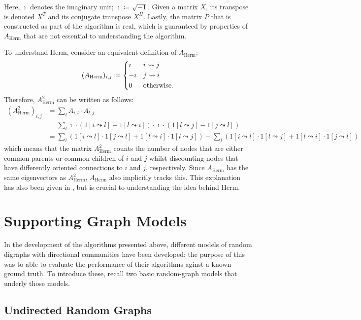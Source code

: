 Here, $\imath$ denotes the imaginary unit; $\imath \coloneqq \sqrt{-1}$. Given a 
matrix $X$, its transpose is denoted $X^T$ and its conjugate transpose $X^H$. Lastly, the matrix $P
$ that is constructed as part of the algorithm is real, which is guaranteed by properties 
of $A_\mathrm{Herm}$ that are not essential to understanding the algorithm.

To understand Herm, consider an equivalent definition of 
$A_\mathrm{Herm}$:
$$
	(A_\mathrm{Herm})_{i,j} \coloneqq
	\begin{dcases}
		\imath & i \leadsto j \\
		- \imath & j \leadsto i \\
		0 & \text{otherwise.}
	\end{dcases}
$$
Therefore, $A_\mathrm{Herm}^2$ can be written as follows:
\begin{align*}
	(A_{\mathrm{Herm}}^2)_{i,j} &= \sum_{l} A_{i,l} \cdot A_{l, j} \\
	&=\sum_l \imath \cdot (1[i \leadsto l] - 1[l \leadsto i]) \cdot \imath \cdot 
	(1[l \leadsto j] - 1[j \leadsto l]) \\
	&= \sum_l (1[i \leadsto l]\cdot1[j \leadsto l] + 1[l \leadsto i]\cdot1[l 
	\leadsto j]) - \sum_l (1[i \leadsto l]\cdot1[l \leadsto j] + 1[l \leadsto i]\cdot1[j 
	\leadsto l])
\end{align*}
which means that the matrix $A_\mathrm{Herm}^2$ counts the number of nodes that are either common 
parents or common children of $i$ and $j$ whilst discounting nodes that have differently oriented 
connections to $i$ and $j$, respectively. Since $A_\mathrm{Herm}$ has the same eigenvectors as 
$A_\mathrm{Herm}^2$, $A_\mathrm{Herm}$ also implicitly tracks this.  This explanation has also been given in \cite{lucapaper},
but is crucial to understanding the idea behind Herm.

\section{Supporting Graph Models}

In the development of the algorithms presented above, different models of random digraphs with directional communities have been developed; the purpose of this was to able to evaluate 
the performance of their algorithms aginst a known ground truth. To introduce these, recall two 
basic random-graph models that underly those models.

\subsection{Undirected Random Graphs}

